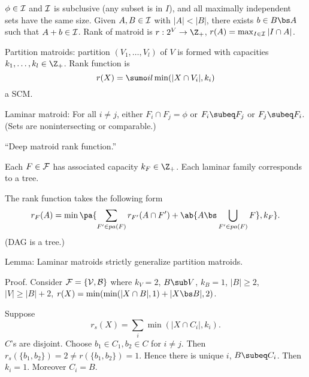 $\phi\in \cal I$ and $\cal I$ is subclusive (any subset is in $I$), and all maximally independent sets have the same size. Given $A,B\in \cal I$ with $|A|<|B|$, there exists $b\in B\bs A$ such that $A+b\in \cal I$. 
Rank of matroid is $r:2^V\to \Z_+$, $r(A)=\max_{I\in \cal I}|I\cap A|$.

Partition matroids: partition $(V_1,\ldots, V_l)$ of $V$ is formed with capacities $k_1,\ldots, k_l\in \Z_+$. Rank function is 
$$
r(X) = \sumo il \min(|X\cap V_i|,k_i)
$$
a SCM.

Laminar matroid: For all $i\ne j$, either $F_i\cap F_j= \phi$ or $F_i\subeq F_j$ or $F_j\subeq F_i$. (Sets are nonintersecting or comparable.)

``Deep matroid rank function.''

Each $F\in \cal F$ has associated capacity $k_F\in \Z_+$. Each laminar family corresponds to a tree.

The rank function takes the following form
$$
r_F (A) = \min\pa{\sum_{F'\in pa(F)}r_{F'}(A\cap F') + \ab{A\bs \bigcup_{F'\in pa(F)} F}, k_F}.
$$
(DAG is a tree.)

Lemma: Laminar matroids strictly generalize partition matroids.

Proof. Consider $\cal F=\{V,B\}$ where $k_V=2$, $B\sub V$, $k_B=1$, $|B|\ge 2$, $|V|\ge |B|+2$, $r(X) = \min(\min(|X\cap B|,1)+|X\bs B|,2)$.

Suppose
$$
r_s(X) = \sum_i \min(|X\cap C_i|,k_i).
$$
$C$'s are disjoint. Choose $b_1\in C_1, b_2\in C$ for $i\ne j$. Then $r_s(\{b_1,b_2\})=2\ne r(\{b_1,b_2\}) = 1$. Hence there is unique $i$, $B\subeq C_i$. Then $k_i=1$. Moreover $C_i=B$.